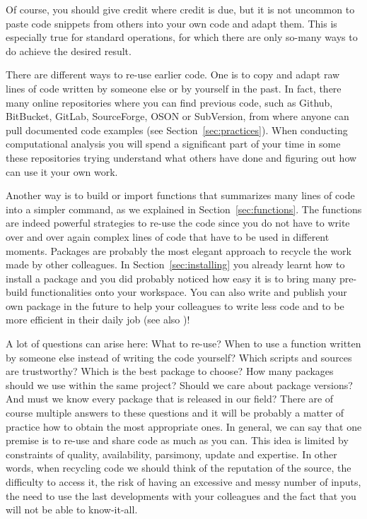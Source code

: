 Of course, you should give credit where credit is due, but it is not uncommon to paste code snippets from others into your own code and adapt them. This is especially true for standard operations, for which there are only so-many ways to do achieve the desired result.

There are different ways to re-use earlier code. One is to copy and adapt raw lines of code written by someone else or by yourself in the past. In fact, there many online repositories where you can find previous code, such as Github, BitBucket, GitLab, SourceForge, OSON or SubVersion, from where anyone can pull documented code examples (see Section~\ref{sec:practices}). When conducting computational analysis you will spend a significant part of your time in some these repositories trying understand what others have done and figuring out how can use it your own work.

Another way is to build or import functions that summarizes many lines of code into a simpler command, as we explained in Section~\ref{sec:functions}. The functions are indeed powerful strategies to re-use the code since you do not have to write over and over again complex lines of code that have to be used in different moments. Packages are probably the most elegant approach to recycle the work made by other colleagues. In Section~\ref{sec:installing} you already learnt how to install a package and you did probably noticed how easy it is to bring many pre-build functionalities onto your workspace. You can also write and publish your own package in the future to help your colleagues to write less code and to be more efficient in their daily job (see also )!


A lot of questions can arise here: What to re-use? When to use a function written by someone else instead of writing the code yourself? Which scripts and sources are trustworthy? Which is the best package to choose? How many packages should we use within the same project? Should we care about package versions? And must we know every package that is released in our field? There are of course multiple answers to these questions and it will be probably a matter of practice how to obtain the most appropriate ones. In general, we can say that one premise is to re-use and share code as much as you can. This idea is limited by constraints of quality, availability, parsimony, update and expertise. In other words, when recycling code we should think of the reputation of the source, the difficulty to access it, the risk of having an excessive and messy number of inputs, the need to use the last developments with your colleagues and the fact that you will not be able to know-it-all.

